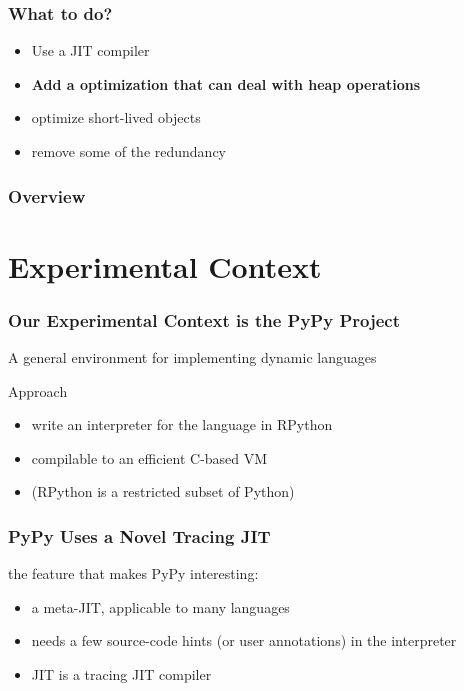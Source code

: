 \documentclass[utf8x]{beamer}
\begin{document}
\begin{frame}
  \frametitle{What to do?}
  \begin{itemize}
      \item Use a JIT compiler
      \item \textbf{Add a optimization that can deal with heap operations}
      \pause
      \item optimize short-lived objects
      \item remove some of the redundancy
  \end{itemize}
\end{frame}

\begin{frame}
  \frametitle{Overview}
  \tableofcontents
\end{frame}

\section{Experimental Context}

\begin{frame}
  \frametitle{Our Experimental Context is the PyPy Project}
  A general environment for implementing dynamic languages
  \pause
  \begin{block}{Approach}
      \begin{itemize}
          \item write an interpreter for the language in RPython
          \item compilable to an efficient C-based VM
          \pause
          \item (RPython is a restricted subset of Python)
      \end{itemize}
  \end{block}
\end{frame}

\begin{frame}
  \frametitle{PyPy Uses a Novel Tracing JIT}
  the feature that makes PyPy interesting:
  \begin{itemize}
      \item a meta-JIT, applicable to many languages
      \item needs a few source-code hints (or user annotations) in the interpreter
      \item JIT is a tracing JIT compiler
  \end{itemize}
\end{frame}
\end{document}
